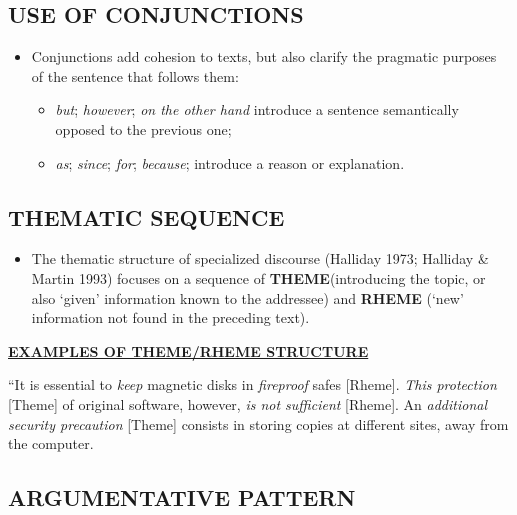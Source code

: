 \subsection{USE OF CONJUNCTIONS}

\begin{itemize}

\item Conjunctions add cohesion to texts, but also clarify the pragmatic purposes of the sentence that follows them: 

\begin{itemize}
\item \textit{but}; \textit{however}; \textit{on the other hand} introduce a sentence semantically opposed to the previous one; 
\item \textit{as}; \textit{since}; \textit{for}; \textit{because}; introduce a reason or explanation. 
\end{itemize}

\end{itemize}

\subsection{THEMATIC SEQUENCE}

\begin{itemize}
\item The thematic structure of specialized discourse (Halliday 1973; Halliday \& Martin 1993) focuses on a sequence of \textbf{THEME}(introducing the topic, or also ‘given’ information known to the addressee) and \textbf{RHEME} (‘new’ information not found in the preceding text).
\end{itemize}

\underline{\textbf{EXAMPLES OF THEME/RHEME STRUCTURE}}

“It is essential to \textit{keep} magnetic disks in \textit{fireproof} safes [Rheme]. \textit{This protection} [Theme] of original software, however, \textit{is not sufficient} [Rheme]. An \textit{additional security precaution} [Theme] consists in storing copies at different sites, away from the computer.  

\subsection{ARGUMENTATIVE PATTERN}

